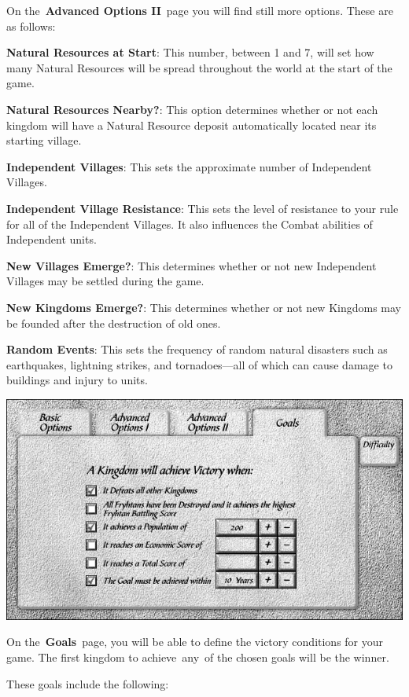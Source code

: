 On the \textbf{Advanced Options II} page you will find still more options. These are as follows:

\textbf{Natural Resources at Start}: This number, between 1 and 7, will set how many Natural Resources will be spread throughout the world at the start of the game.

\textbf{Natural Resources Nearby?}: This option determines whether or not each kingdom will have a Natural Resource deposit automatically located near its starting village.

\textbf{Independent Villages}: This sets the approximate number of Independent Villages.

\textbf{Independent Village Resistance}: This sets the level of resistance to your rule for all of the Independent Villages. It also influences the Combat abilities of Independent units.

\textbf{New Villages Emerge?}: This determines whether or not new Independent Villages may be settled during the game.

\textbf{New Kingdoms Emerge?}: This determines whether or not new Kingdoms may be founded after the destruction of old ones.

\textbf{Random Events}: This sets the frequency of random natural disasters such as earthquakes, lightning strikes, and tornadoes---all of which can cause damage to buildings and injury to units.

\begin{center}
	\includegraphics[width=0.9\linewidth]{Igoals}
\end{center}

On the \textbf{Goals} page, you will be able to define the victory conditions for your game. The first kingdom to achieve any of the chosen goals will be the winner.

These goals include the following:

